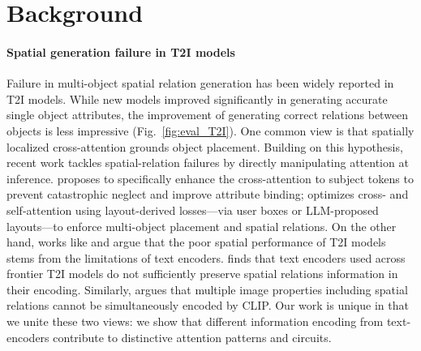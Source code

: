 \documentclass[10pt,twocolumn,letterpaper]{article}
\begin{document}
\section{Background}
\paragraph{Spatial generation failure in T2I models}
Failure in multi-object spatial relation generation has been widely reported in T2I models. While new models improved significantly in generating accurate single object attributes, the improvement of generating correct relations between objects is less impressive (Fig.~\ref{fig:eval_T2I}). One common view is that spatially localized cross-attention grounds object placement. Building on this hypothesis, recent work tackles spatial-relation failures by directly manipulating attention at inference. \cite{chefer2023attendandexciteattentionbasedsemanticguidance} proposes to specifically enhance the cross-attention to subject tokens to prevent catastrophic neglect and improve attribute binding; \cite{phung2023groundedtexttoimagesynthesisattention} optimizes cross- and self-attention using layout-derived losses—via user boxes or LLM-proposed layouts—to enforce multi-object placement and spatial relations. On the other hand, works like \cite{zhang2024compassenhancingspatialunderstanding} and \cite{kang2025clipidealnofix} argue that the poor spatial performance of T2I models stems from the limitations of text encoders. \cite{zhang2024compassenhancingspatialunderstanding} finds that text encoders used across frontier T2I models do not sufficiently preserve spatial relations information in their encoding. Similarly, \cite{kang2025clipidealnofix} argues that multiple image properties including spatial relations cannot be simultaneously encoded by CLIP. Our work is unique in that we unite these two views: we show that different information encoding from text-encoders contribute to distinctive attention patterns and circuits. 

\end{document}
